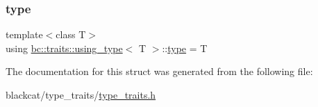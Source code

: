 \subsubsection{\texorpdfstring{type}{type}}
{\footnotesize\ttfamily template$<$class T$>$ \\
using \hyperlink{structbc_1_1traits_1_1using__type}{bc\+::traits\+::using\+\_\+type}$<$ T $>$\+::\hyperlink{structbc_1_1traits_1_1using__type_a5050f5559333f1af265d26c146de11df}{type} =  T}



The documentation for this struct was generated from the following file\+:\begin{DoxyCompactItemize}
\item 
blackcat/type\+\_\+traits/\hyperlink{type__traits_2type__traits_8h}{type\+\_\+traits.\+h}\end{DoxyCompactItemize}
